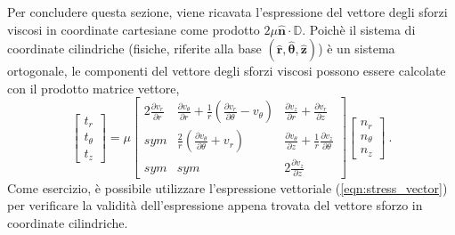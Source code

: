 Per concludere questa sezione, viene ricavata l'espressione del vettore degli sforzi viscosi in coordinate cartesiane come prodotto $2 \mu \bm{\hat{n}} \cdot \mathbb{D}$. Poichè il sistema di coordinate cilindriche (fisiche, riferite alla base $(\bm{\hat{r}},\bm{\hat{\theta}},\bm{\hat{z}})$) è un sistema ortogonale, le componenti del vettore degli sforzi viscosi possono essere calcolate con il prodotto matrice vettore,
\begin{equation}
 \begin{bmatrix} t_{r} \\ t_{\theta} \\ t_z \end{bmatrix} = \mu
 \begin{bmatrix}
 2 \frac{\partial v_r}{\partial r} & 
 \frac{\partial v_\theta}{\partial r} + \frac{1}{r}\left( \frac{\partial v_r}{\partial \theta}-v_\theta \right) &
 \frac{\partial v_z}{\partial r} + \frac{\partial v_r}{\partial z}   \\
 sym & 
 \frac{2}{r}\left( \frac{\partial v_\theta}{\partial \theta}+v_r \right) & 
 \frac{\partial v_\theta}{\partial z} +  \frac{1}{r}\frac{\partial v_z}{\partial \theta} \\
 sym &
 sym &
 2 \frac{\partial v_z}{\partial z}
\end{bmatrix}
 \begin{bmatrix} n_{r} \\ n_{\theta} \\ n_z \end{bmatrix} \ .
\end{equation}
Come esercizio, è possibile utilizzare l'espressione vettoriale (\ref{eqn:stress_vector}) per verificare la validità dell'espressione appena trovata del vettore sforzo in coordinate cilindriche.





